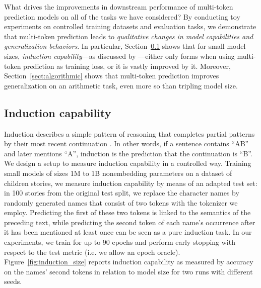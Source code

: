 What drives the improvements in downstream performance of multi-token prediction models on all of the tasks we have considered? By conducting toy experiments on controlled training datasets and evaluation tasks, we demonstrate that multi-token prediction leads to \emph{qualitative changes in model capabilities and generalization behaviors}.
In particular, Section~\ref{sect:induction} shows that for small model sizes, \emph{induction capability}---as discussed by \citet{olsson2022context}---either only forms when using multi-token prediction as training loss, or it is vastly improved by it. Moreover, Section~\ref{sect:algorithmic} shows that multi-token prediction improves generalization on an arithmetic task, even more so than tripling model size.

\subsection{Induction capability}
\label{sect:induction}

Induction describes a simple pattern of reasoning that completes partial patterns by their most recent continuation \citep{olsson2022context}. In other words, if a sentence contains ``AB'' and later mentions ``A'', induction is the prediction that the continuation is ``B''. We design a setup to measure induction capability in a controlled way. Training small models of sizes 1M to 1B nonembedding parameters on a dataset of children stories, we measure induction capability by means of an adapted test set: in 100 stories from the original test split, we replace the character names by randomly generated names that consist of two tokens with the tokenizer we employ.
Predicting the first of these two tokens is linked to the semantics of the preceding text, while predicting the second token of each name's occurrence after it has been mentioned at least once can be seen as a pure induction task. In our experiments, we train for up to 90 epochs and perform early stopping with respect to the test metric (i.e. we allow an epoch oracle). Figure~\ref{fig:induction_size} reports induction capability as measured by accuracy on the names' second tokens in relation to model size for two runs with different seeds.

